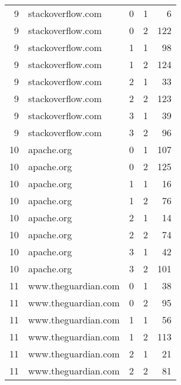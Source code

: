 \begin{tabular}{rllrr}
  9 &    stackoverflow.com &                  0 &       1 &                6 \\
  9 &    stackoverflow.com &                  0 &       2 &              122 \\
  9 &    stackoverflow.com &                  1 &       1 &               98 \\
  9 &    stackoverflow.com &                  1 &       2 &              124 \\
  9 &    stackoverflow.com &                  2 &       1 &               33 \\
  9 &    stackoverflow.com &                  2 &       2 &              123 \\
  9 &    stackoverflow.com &                  3 &       1 &               39 \\
  9 &    stackoverflow.com &                  3 &       2 &               96 \\
 10 &           apache.org &                  0 &       1 &              107 \\
 10 &           apache.org &                  0 &       2 &              125 \\
 10 &           apache.org &                  1 &       1 &               16 \\
 10 &           apache.org &                  1 &       2 &               76 \\
 10 &           apache.org &                  2 &       1 &               14 \\
 10 &           apache.org &                  2 &       2 &               74 \\
 10 &           apache.org &                  3 &       1 &               42 \\
 10 &           apache.org &                  3 &       2 &              101 \\
 11 &  www.theguardian.com &                  0 &       1 &               38 \\
 11 &  www.theguardian.com &                  0 &       2 &               95 \\
 11 &  www.theguardian.com &                  1 &       1 &               56 \\
 11 &  www.theguardian.com &                  1 &       2 &              113 \\
 11 &  www.theguardian.com &                  2 &       1 &               21 \\
 11 &  www.theguardian.com &                  2 &       2 &               81 \\

\end{tabular}
